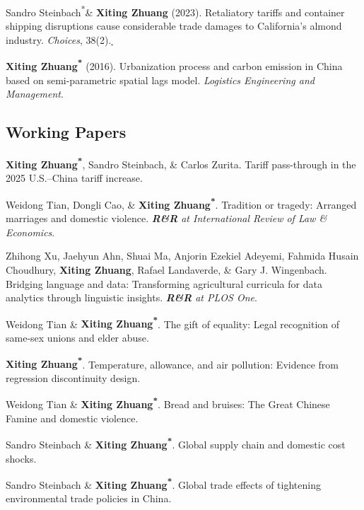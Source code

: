 \documentclass[10.8 pt,letterpaper]{article}
\newcommand{\corrauthor}{\textsuperscript{*}}
\newcommand{\paperlink}[1]{\href{#1}{\,\small\faExternalLink}}
\renewenvironment{itemize}{
	\begin{list}{}{
			\setlength{\leftmargin}{1.5em}
		}
	}{
	\end{list}
}
\begin{document}
\begin{itemize}
		\item[-] Sandro Steinbach\corrauthor \& \textbf{Xiting Zhuang} (2023). Retaliatory tariffs and container shipping disruptions cause considerable trade damages to California's almond industry. \textit{Choices}, 38(2).\paperlink{https://www.choicesmagazine.org/choices-magazine/submitted-articles/retaliatory-tariffs-and-container-shipping-disruptions-cause-considerable-trade-damages-to-californias-almond-industry}
		
		\item[-] \textbf{Xiting Zhuang\corrauthor} (2016). Urbanization process and carbon emission in China based on semi-parametric spatial lags model. \textit{Logistics Engineering and Management}.
	\end{itemize}
	
	
	\subsection*{\textbf{Working Papers}}
	\begin{itemize}
		
 		\item[-] \textbf{Xiting Zhuang\corrauthor}, Sandro Steinbach, \& Carlos Zurita. Tariff pass-through in the 2025 U.S.--China tariff increase.
 
 
		\item[-] Weidong Tian, Dongli Cao, \& \textbf{Xiting Zhuang\corrauthor}. Tradition or tragedy: Arranged marriages and domestic violence. \emph{\textbf{R\&R} at \textit{International Review of Law \& Economics}}.
		

		
		\item[-] Zhihong Xu, Jaehyun Ahn, Shuai Ma, Anjorin Ezekiel Adeyemi, Fahmida Husain Choudhury, \textbf{Xiting Zhuang}, Rafael Landaverde, \& Gary J. Wingenbach. Bridging language and data: Transforming agricultural curricula for data analytics through linguistic insights. \emph{\textbf{R\&R} at \textit{PLOS One}}.
		
		\item[-] Weidong Tian \& \textbf{Xiting Zhuang\corrauthor}. The gift of equality: Legal recognition of same-sex unions and elder abuse.  
		
 
		
		\item[-] \textbf{Xiting Zhuang\corrauthor}. Temperature, allowance, and air pollution: Evidence from regression discontinuity design.
		
		\item[-] Weidong Tian \& \textbf{Xiting Zhuang\corrauthor}. Bread and bruises: The Great Chinese Famine and domestic violence.
		
		\item[-] Sandro Steinbach \& \textbf{Xiting Zhuang\corrauthor}. Global supply chain and domestic cost shocks.
		
		\item[-] Sandro Steinbach \& \textbf{Xiting Zhuang\corrauthor}. Global trade effects of tightening environmental trade policies in China.
	\end{itemize}
	
\end{document}
